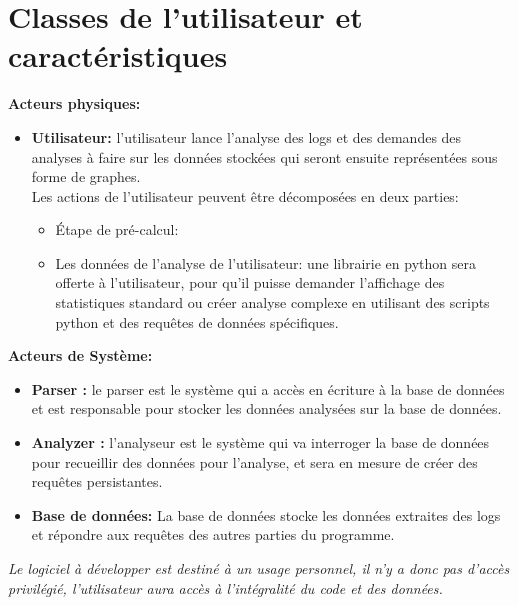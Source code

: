 \documentclass{scrreprt}
\begin{document}
\section{Classes de l'utilisateur et caractéristiques}

\textbf{Acteurs physiques:}\\

\begin{itemize}
 \item \textbf{Utilisateur:} l'utilisateur lance l'analyse des logs et des demandes des analyses à faire sur les données stockées qui seront ensuite représentées sous forme de graphes.\\
   Les actions de l'utilisateur peuvent être décomposées en deux parties:
   \begin{itemize}
   \item Étape de pré-calcul: %
   \item Les données de l'analyse de l'utilisateur: une librairie en python sera offerte à l'utilisateur, pour qu'il puisse demander l'affichage des statistiques standard ou créer analyse complexe en utilisant des scripts python et des requêtes de données spécifiques. 
   \end{itemize}
\end{itemize}

\textbf{Acteurs de Système:}\\
\begin{itemize}
 \item \textbf{Parser :} le parser est le système qui a accès en écriture à la base de données et est responsable pour stocker les données analysées sur la base de données.

 \item \textbf{Analyzer :} l'analyseur est le système qui va interroger la base de données pour recueillir des données pour l'analyse, et sera en mesure de créer des requêtes persistantes.

   \item \textbf{Base de données: } La base de données stocke les données extraites des logs et répondre aux requêtes des autres parties du programme.
\end{itemize}

\textit{Le logiciel à développer est destiné à un usage personnel, il n'y a donc pas d'accès privilégié, l'utilisateur aura accès à l'intégralité du code et des données.}
\end{document}
